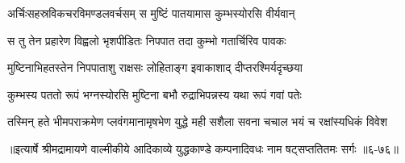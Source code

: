 \twolineshloka
{अर्चिःसहस्रविकचरविमण्डलवर्चसम्}
{स मुष्टिं पातयामास कुम्भस्योरसि वीर्यवान्} %

\twolineshloka
{स तु तेन प्रहारेण विह्वलो भृशपीडितः}
{निपपात तदा कुम्भो गतार्चिरिव पावकः} %

\twolineshloka
{मुष्टिनाभिहतस्तेन निपपाताशु राक्षसः}
{लोहिताङ्ग इवाकाशाद् दीप्तरश्मिर्यदृच्छया} %

\twolineshloka
{कुम्भस्य पततो रूपं भग्नस्योरसि मुष्टिना}
{बभौ रुद्राभिपन्नस्य यथा रूपं गवां पतेः} %

\twolineshloka
{तस्मिन् हते भीमपराक्रमेण प्लवंगमानामृषभेण युद्धे}
{मही सशैला सवना चचाल भयं च रक्षांस्यधिकं विवेश} %


॥इत्यार्षे श्रीमद्रामायणे वाल्मीकीये आदिकाव्ये युद्धकाण्डे कम्पनादिवधः नाम षट्सप्ततितमः सर्गः ॥६-७६॥

